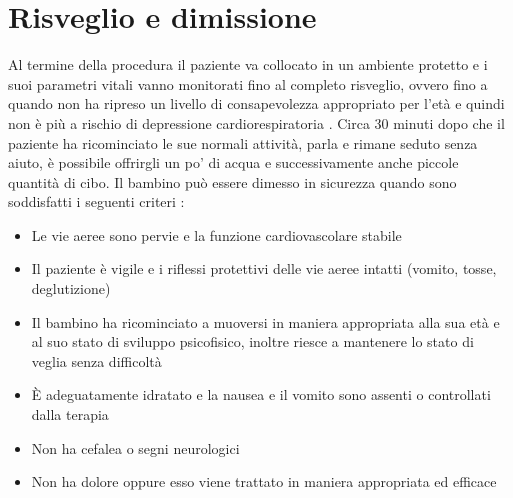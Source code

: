 \section{Risveglio e dimissione}

Al termine della procedura il paziente va collocato in un ambiente protetto e i suoi parametri vitali vanno monitorati fino al completo risveglio, ovvero fino a quando non ha ripreso un livello di consapevolezza appropriato per l'età e quindi non è più a rischio di depressione cardiorespiratoria \cite{Krauss2006}. Circa 30 minuti dopo che il paziente ha ricominciato le sue normali attività, parla e rimane seduto senza aiuto, è possibile offrirgli un po' di acqua e successivamente anche piccole quantità di cibo. Il bambino può essere dimesso in sicurezza quando sono soddisfatti i seguenti criteri \cite{Uptodatesed, Simeupsedazione}: 
\begin{itemize}
    \item Le vie aeree sono pervie e la funzione cardiovascolare stabile
    \item Il paziente è vigile e i riflessi protettivi delle vie aeree intatti (vomito, tosse, deglutizione)
    \item Il bambino ha ricominciato a muoversi in maniera appropriata alla sua età e al suo stato di sviluppo psicofisico, inoltre riesce a mantenere lo stato di veglia senza difficoltà
    \item \`E adeguatamente idratato e la nausea e il vomito sono assenti o controllati dalla terapia
    \item Non ha cefalea o segni neurologici
    \item Non ha dolore oppure esso viene trattato in maniera appropriata ed efficace
\end{itemize}